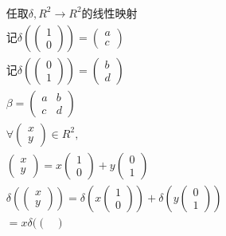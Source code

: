 \documentclass[12pt, a4paper]{article}  %
\begin{document}
\begin{align}
    &\text{任取}\delta,R^2\rightarrow R^2\text{的线性映射}\\
    &\text{记}\delta( \begin{pmatrix}
        1\\
        0
    \end{pmatrix})=\begin{pmatrix}
        a\\
        c
    \end{pmatrix}\\
    &\text{记}\delta( \begin{pmatrix}
        0\\
        1
    \end{pmatrix})=\begin{pmatrix}
        b\\
        d
    \end{pmatrix}\\
    &\beta=\begin{pmatrix}
        a&b\\
        c&d
    \end{pmatrix}\\
    & \forall \begin{pmatrix}
        x\\y
    \end{pmatrix}\in R^2,\\
    &\begin{pmatrix}
        x\\y
    \end{pmatrix}=x\begin{pmatrix}
        1\\0
    \end{pmatrix}+y\begin{pmatrix}
        0\\1
    \end{pmatrix}\\
    &\delta (\begin{pmatrix}
        x\\y
    \end{pmatrix})=\delta (x\begin{pmatrix}
        1\\0
    \end{pmatrix})+\delta (y\begin{pmatrix}
        0\\1
    \end{pmatrix})\\
    &=x \delta (\begin{pmatrix}

\end{pmatrix}
\end{align}
\end{document}
